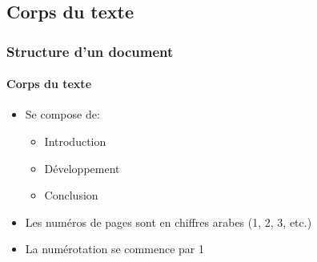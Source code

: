 \documentclass[xcolor=table]{beamer}
\begin{document}
\subsection{Corps du texte}

\begin{frame}
\frametitle{Structure d'un document}
\framesubtitle{Corps du texte}

\begin{itemize}
	\item Se compose de: 
	\begin{itemize}
		\item Introduction
		\item Développement  
		\item Conclusion 
	\end{itemize}
	\item Les numéros de pages sont en chiffres arabes (1, 2, 3, etc.) 
	\item La numérotation se commence par 1 
\end{itemize}

\end{frame}
\end{document}
